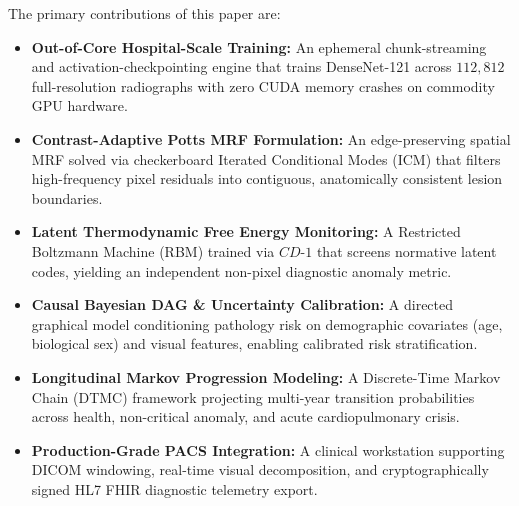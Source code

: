 \documentclass[conference]{IEEEtran}
\begin{document}
The primary contributions of this paper are:
\begin{itemize}
    \item \textbf{Out-of-Core Hospital-Scale Training:} An ephemeral chunk-streaming and activation-checkpointing engine that trains DenseNet-121 across $112,812$ full-resolution radiographs with zero CUDA memory crashes on commodity GPU hardware.
    \item \textbf{Contrast-Adaptive Potts MRF Formulation:} An edge-preserving spatial MRF solved via checkerboard Iterated Conditional Modes (ICM) that filters high-frequency pixel residuals into contiguous, anatomically consistent lesion boundaries.
    \item \textbf{Latent Thermodynamic Free Energy Monitoring:} A Restricted Boltzmann Machine (RBM) trained via $CD\text{-}1$ that screens normative latent codes, yielding an independent non-pixel diagnostic anomaly metric.
    \item \textbf{Causal Bayesian DAG \& Uncertainty Calibration:} A directed graphical model conditioning pathology risk on demographic covariates (age, biological sex) and visual features, enabling calibrated risk stratification.
    \item \textbf{Longitudinal Markov Progression Modeling:} A Discrete-Time Markov Chain (DTMC) framework projecting multi-year transition probabilities across health, non-critical anomaly, and acute cardiopulmonary crisis.
    \item \textbf{Production-Grade PACS Integration:} A clinical workstation supporting DICOM windowing, real-time visual decomposition, and cryptographically signed HL7 FHIR diagnostic telemetry export.
\end{itemize}
\end{document}
